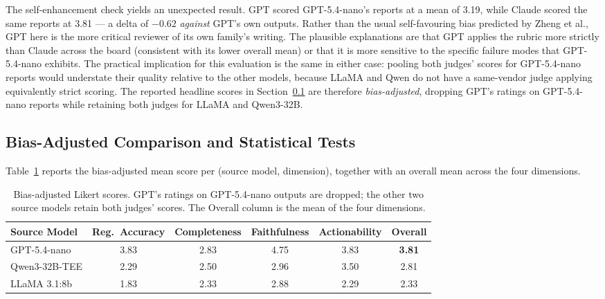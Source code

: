 \documentclass[]{UCD_CS_FYP_Report}
\begin{document}
The self-enhancement check yields an unexpected result. GPT scored GPT-5.4-nano's reports at a mean of 3.19, while Claude scored the same reports at 3.81 --- a delta of $-0.62$ \textit{against} GPT's own outputs. Rather than the usual self-favouring bias predicted by Zheng et al.\cite{ZhengMTBench2023}, GPT here is the more critical reviewer of its own family's writing. The plausible explanations are that GPT applies the rubric more strictly than Claude across the board (consistent with its lower overall mean) or that it is more sensitive to the specific failure modes that GPT-5.4-nano exhibits. The practical implication for this evaluation is the same in either case: pooling both judges' scores for GPT-5.4-nano reports would understate their quality relative to the other models, because LLaMA and Qwen do not have a same-vendor judge applying equivalently strict scoring. The reported headline scores in Section~\ref{sec:judge_bias_adjusted} are therefore \textit{bias-adjusted}, dropping GPT's ratings on GPT-5.4-nano reports while retaining both judges for LLaMA and Qwen3-32B.

\subsection{Bias-Adjusted Comparison and Statistical Tests}
\label{sec:judge_bias_adjusted}

Table~\ref{tab:judge_bias_adjusted} reports the bias-adjusted mean score per (source model, dimension), together with an overall mean across the four dimensions.

\begin{table}[!ht]
    \centering
    {\footnotesize
    \begin{tabular}{|l|c|c|c|c|c|}
    \hline
    \textbf{Source Model} & \textbf{Reg.\ Accuracy} & \textbf{Completeness} & \textbf{Faithfulness} & \textbf{Actionability} & \textbf{Overall} \\ \hline
    GPT-5.4-nano       & 3.83 & 2.83 & 4.75 & 3.83 & \textbf{3.81} \\ \hline
    Qwen3-32B-TEE      & 2.29 & 2.50 & 2.96 & 3.50 & 2.81          \\ \hline
    LLaMA 3.1:8b       & 1.83 & 2.33 & 2.88 & 2.29 & 2.33          \\ \hline
    \end{tabular}
    }
    \caption{Bias-adjusted Likert scores. GPT's ratings on GPT-5.4-nano outputs are dropped; the other two source models retain both judges' scores. The Overall column is the mean of the four dimensions.}
    \label{tab:judge_bias_adjusted}
\end{table}
\end{document}
